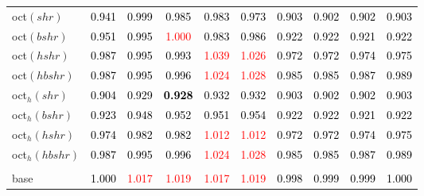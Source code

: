 \begin{tabular}[t]{l|ccccccccc}
oct$(shr)$ & \textcolor{black}{0.941} & \textcolor{black}{0.999} & \textcolor{black}{0.985} & \textcolor{black}{0.983} & \textcolor{black}{0.973} & \textcolor{black}{0.903} & \textcolor{black}{0.902} & \textcolor{black}{0.902} & \textcolor{black}{0.903}\\
oct$(bshr)$ & \textcolor{black}{0.951} & \textcolor{black}{0.995} & \textcolor{red}{1.000} & \textcolor{black}{0.983} & \textcolor{black}{0.986} & \textcolor{black}{0.922} & \textcolor{black}{0.922} & \textcolor{black}{0.921} & \textcolor{black}{0.922}\\
oct$(hshr)$ & \textcolor{black}{0.987} & \textcolor{black}{0.995} & \textcolor{black}{0.993} & \textcolor{red}{1.039} & \textcolor{red}{1.026} & \textcolor{black}{0.972} & \textcolor{black}{0.972} & \textcolor{black}{0.974} & \textcolor{black}{0.975}\\
oct$(hbshr)$ & \textcolor{black}{0.987} & \textcolor{black}{0.995} & \textcolor{black}{0.996} & \textcolor{red}{1.024} & \textcolor{red}{1.028} & \textcolor{black}{0.985} & \textcolor{black}{0.985} & \textcolor{black}{0.987} & \textcolor{black}{0.989}\\
oct$_h(shr)$ & \textcolor{black}{0.904} & \textcolor{black}{0.929} & \textcolor{black}{\textbf{0.928}} & \textcolor{black}{0.932} & \textcolor{black}{0.932} & \textcolor{black}{0.903} & \textcolor{black}{0.902} & \textcolor{black}{0.902} & \textcolor{black}{0.903}\\
oct$_h(bshr)$ & \textcolor{black}{0.923} & \textcolor{black}{0.948} & \textcolor{black}{0.952} & \textcolor{black}{0.951} & \textcolor{black}{0.954} & \textcolor{black}{0.922} & \textcolor{black}{0.922} & \textcolor{black}{0.921} & \textcolor{black}{0.922}\\
oct$_h(hshr)$ & \textcolor{black}{0.974} & \textcolor{black}{0.982} & \textcolor{black}{0.982} & \textcolor{red}{1.012} & \textcolor{red}{1.012} & \textcolor{black}{0.972} & \textcolor{black}{0.972} & \textcolor{black}{0.974} & \textcolor{black}{0.975}\\
oct$_h(hbshr)$ & \textcolor{black}{0.987} & \textcolor{black}{0.995} & \textcolor{black}{0.996} & \textcolor{red}{1.024} & \textcolor{red}{1.028} & \textcolor{black}{0.985} & \textcolor{black}{0.985} & \textcolor{black}{0.987} & \textcolor{black}{0.989}\\
\addlinespace[0.3em]
\multicolumn{10}{c}{\textbf{$k = 1$}}\\
base & \textcolor{black}{1.000} & \textcolor{red}{1.017} & \textcolor{red}{1.019} & \textcolor{red}{1.017} & \textcolor{red}{1.019} & \textcolor{black}{0.998} & \textcolor{black}{0.999} & \textcolor{black}{0.999} & \textcolor{black}{1.000}\\

\end{tabular}
